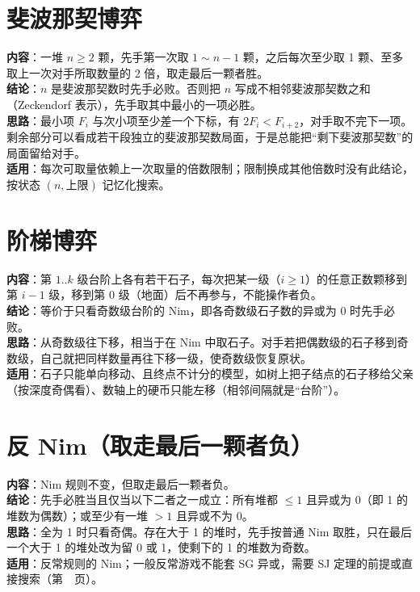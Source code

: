 \section{斐波那契博弈}\label{knowledge-game-fibonacci}
\textbf{内容}：一堆 $n\ge2$ 颗，先手第一次取 $1\sim n-1$ 颗，之后每次至少取 1 颗、至多取上一次对手所取数量的 2 倍，取走最后一颗者胜。\\
\textbf{结论}：$n$ 是斐波那契数时先手必败。否则把 $n$ 写成不相邻斐波那契数之和（Zeckendorf 表示），先手取其中最小的一项必胜。\\
\textbf{思路}：最小项 $F_i$ 与次小项至少差一个下标，有 $2F_i<F_{i+2}$，对手取不完下一项。剩余部分可以看成若干段独立的斐波那契数局面，于是总能把“剩下斐波那契数”的局面留给对手。\\
\textbf{适用}：每次可取量依赖上一次取量的倍数限制；限制换成其他倍数时没有此结论，按状态 $(n,\text{上限})$ 记忆化搜索。

\section{阶梯博弈}\label{knowledge-game-staircase}
\textbf{内容}：第 $1..k$ 级台阶上各有若干石子，每次把某一级（$i\ge1$）的任意正数颗移到第 $i-1$ 级，移到第 $0$ 级（地面）后不再参与，不能操作者负。\\
\textbf{结论}：等价于只看奇数级台阶的 Nim，即各奇数级石子数的异或为 $0$ 时先手必败。\\
\textbf{思路}：从奇数级往下移，相当于在 Nim 中取石子。对手若把偶数级的石子移到奇数级，自己就把同样数量再往下移一级，使奇数级恢复原状。\\
\textbf{适用}：石子只能单向移动、且终点不计分的模型，如树上把子结点的石子移给父亲（按深度奇偶看）、数轴上的硬币只能左移（相邻间隔就是“台阶”）。

\section{反 Nim（取走最后一颗者负）}\label{knowledge-game-anti-nim}
\textbf{内容}：Nim 规则不变，但取走最后一颗者负。\\
\textbf{结论}：先手必胜当且仅当以下二者之一成立：所有堆都 $\le1$ 且异或为 $0$（即 1 的堆数为偶数）；或至少有一堆 $>1$ 且异或不为 $0$。\\
\textbf{思路}：全为 1 时只看奇偶。存在大于 1 的堆时，先手按普通 Nim 取胜，只在最后一个大于 1 的堆处改为留 0 或 1，使剩下的 1 的堆数为奇数。\\
\textbf{适用}：反常规则的 Nim；一般反常游戏不能套 SG 异或，需要 SJ 定理的前提或直接搜索（第~\pageref{knowledge-subtraction-game}~页）。

